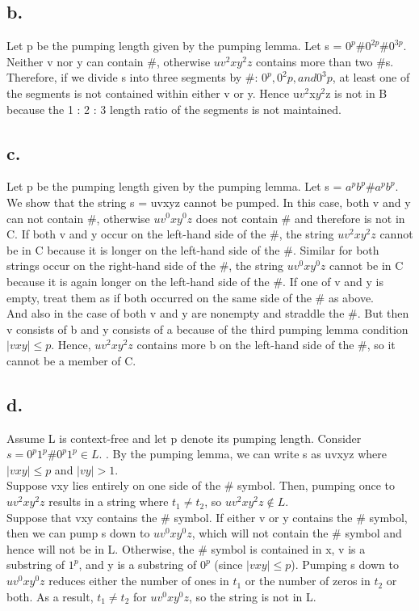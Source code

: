 \documentclass{scrartcl}
\begin{document}
\subsection*{b.}
Let p be the pumping length given by the pumping lemma. Let s = $0^p$\#$0^{2p}$\#$0^{3p}$.
Neither v nor y can contain \#, otherwise $uv^2xy^2z$ contains more than two \#s.
Therefore, if we divide s into three segments by \#: $0^p, 0^2p, and 0^3p$, at least one
of the segments is not contained within either v or y. Hence u$v^2$x$y^2$z is not in B
because the 1 : 2 : 3 length ratio of the segments is not maintained. 

\subsection*{c.}

Let p be the pumping length given by the pumping lemma. Let s = $a^p$$b^p$\#$a^pb^p$. We show that
the string s = uvxyz cannot be pumped. In this case, both v and y can not contain \#, otherwise
$uv^0xy^0z$ does not contain \# and therefore is not in C. If both v and y occur on the left-hand side of the \#, the string $uv^2xy^2z$ cannot be in C because it is longer on the left-hand side of the \#. Similar for both strings occur on the right-hand side of the \#, the string $uv^0xy^0z$ cannot be in C because it is again longer on the left-hand side of the \#. If one of v and y is empty, treat them as if both occurred on the same side of the \# as
above.\\
And also in the case of both v and y are nonempty and straddle the \#. But then v consists of b and y consists of a because of the third pumping lemma condition $\mid vxy \mid \leq p$.
Hence, $uv^2xy^2z$ contains more b on the left-hand side of  the \#, so it cannot be a member of C.

\subsection*{d.}
 Assume L is context-free and let p denote its pumping length. Consider $s = 0^p1^p\#0^p1^p \in L$. . By the pumping lemma, we can write s as uvxyz where $\mid vxy \mid \leq p$ and $\mid vy \mid > 1$.\\
 Suppose vxy lies entirely on one side of the \# symbol. Then, pumping once to $uv^2xy^2z$ results in a string where $t_1 \neq t_2$, so $uv^2xy^2z \notin L$.\\
 Suppose that vxy contains the \# symbol. If either v or y contains the \# symbol, then we can
 pump s down to $uv^0xy^0z$, which will not contain the \# symbol and hence will not be in L.
Otherwise, the \# symbol is contained in x, v is a substring of $1^p$, and y is a substring of $0^p$ (since $\mid vxy \mid \leq p$). Pumping s down to $uv^0xy^0z$ reduces either the number of ones in $t_1$ or the number of zeros in $t_2$ or both.  As a result, $t_1 \neq t_2$ for $uv^0xy^0z$, so the string is not in L.
\end{document}
